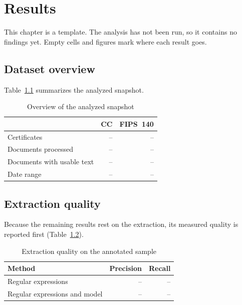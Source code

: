 \chapter{Results}
\label{ch:results}

{This chapter is a template. The analysis has not been run, so it contains no
findings yet. Empty cells and figures mark where each result goes.}

\section{Dataset overview}
\label{sec:results-overview}

Table~\ref{tab:dataset} summarizes the analyzed snapshot.

\begin{table}[htbp]
  \centering
  \caption{Overview of the analyzed snapshot}
  \label{tab:dataset}
  \begin{tabular}{lrr}
    \toprule
    & CC & FIPS~140 \\
    \midrule
    Certificates & -- & -- \\
    Documents processed & -- & -- \\
    Documents with usable text & -- & -- \\
    Date range & -- & -- \\
    \bottomrule
  \end{tabular}
\end{table}

\section{Extraction quality}
\label{sec:results-quality}

Because the remaining results rest on the extraction, its measured quality is
reported first (Table~\ref{tab:quality}).

\begin{table}[htbp]
  \centering
  \caption{Extraction quality on the annotated sample}
  \label{tab:quality}
  \begin{tabular}{lrr}
    \toprule
    Method & Precision & Recall \\
    \midrule
    Regular expressions & -- & -- \\
    Regular expressions and model & -- & -- \\
    \bottomrule
  \end{tabular}
\end{table}

